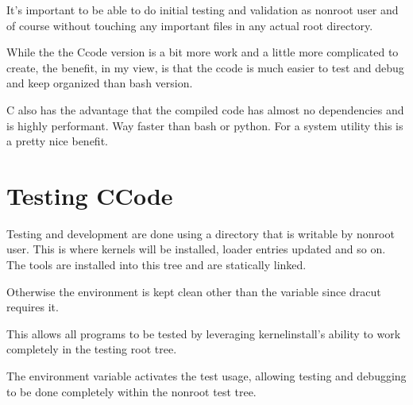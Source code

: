 \documentclass[letterpaper,11pt,english]{sphinxmanual}
\begin{document}
\sphinxAtStartPar
It’s important to be able to do initial testing and validation as non\sphinxhyphen{}root user
and of course without touching any important files in any actual root directory.

\sphinxAtStartPar
While the the C\sphinxhyphen{}code version is a bit more work and a little more complicated to create,
the benefit, in my view, is that the c\sphinxhyphen{}code is much easier to test and debug
and keep organized than bash version.

\sphinxAtStartPar
C also has the advantage that the compiled code has almost no dependencies and
is highly performant. Way faster than bash or python. For a system utility this
is a pretty nice benefit.


\section{Testing C\sphinxhyphen{}Code}
\label{\detokenize{Development:testing-c-code}}
\sphinxAtStartPar
Testing and development are done using a  directory that is writable by non\sphinxhyphen{}root user.
This is where kernels will be installed, loader entries updated and so on. The tools
are installed into this tree and are statically linked.

\sphinxAtStartPar
Otherwise the environment is kept clean other than the  variable since dracut requires it.

\sphinxAtStartPar
This allows all programs to be tested by leveraging kernel\sphinxhyphen{}install’s ability to work
completely in the testing root tree.

\sphinxAtStartPar
The environment variable  activates the test usage, allowing
testing and debugging to be done completely within the non\sphinxhyphen{}root test tree.
\end{document}
